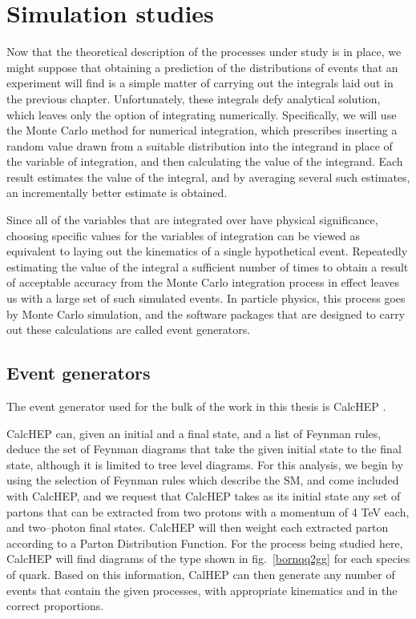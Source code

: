 \chapter{Simulation studies}\label{ch.mc}

Now that the theoretical description of the processes under study is in place, we might suppose that obtaining a prediction of the distributions of events that an experiment will find is a simple matter of carrying out the integrals laid out in the previous chapter. Unfortunately, these integrals defy analytical solution, which leaves only the option of integrating numerically. Specifically, we will use the Monte Carlo method for numerical integration, which prescribes inserting a random value drawn from a suitable distribution into the integrand in place of the variable of integration, and then calculating the value of the integrand. Each result estimates the value of the integral, and by averaging several such estimates, an incrementally better estimate is obtained.

Since all of the variables that are integrated over have physical significance, choosing specific values for the variables of integration can be viewed as equivalent to laying out the kinematics of a single hypothetical event. Repeatedly estimating the value of the integral a sufficient number of times to obtain a result of acceptable accuracy from the Monte Carlo integration process in effect leaves us with a large set of such simulated events. In particle physics, this process goes by Monte Carlo simulation, and the software packages that are designed to carry out these calculations are called event generators.

\section{Event generators}

The event generator used for the bulk of the work in this thesis is CalcHEP \cite{calchep}.

CalcHEP can, given an initial and a final state, and a list of Feynman rules, deduce the set of Feynman diagrams that take the given initial state to the final state, although it is limited to tree level diagrams. For this analysis, we begin by using the selection of Feynman rules which describe the SM, and come included with CalcHEP, and we request that CalcHEP takes as its initial state any set of partons that can be extracted from two protons with a momentum of 4 TeV each, and two--photon final states. CalcHEP will then weight each extracted parton according to a Parton Distribution Function. For the process being studied here, CalcHEP will find diagrams of the type shown in fig.~\ref{bornqq2gg} for each species of quark. Based on this information, CalHEP can then generate any number of events that contain the given processes, with appropriate kinematics and in the correct proportions.

